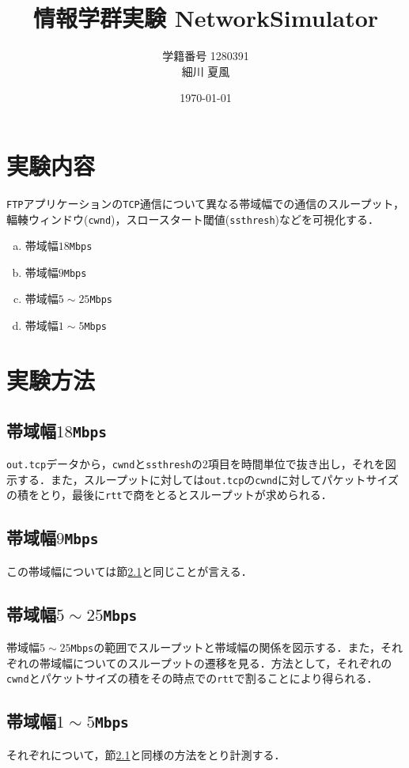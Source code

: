 \documentclass[paper=a4, fontsize=10pt]{jlreq}
\title{情報学群実験 NetworkSimulator}
\author{学籍番号 1280391 \\ 細川 夏風}
\date{\today}
\begin{document}
\maketitle
\section{実験内容}
\texttt{FTP}アプリケーションの\texttt{TCP}通信について異なる帯域幅での通信のスループット，輻輳ウィンドウ(\texttt{cwnd})，スロースタート閾値(\texttt{ssthresh})などを可視化する．
\begin{enumerate}[(a). ]
  \item 帯域幅$18$\texttt{Mbps}
  \item 帯域幅$9$\texttt{Mbps}
  \item 帯域幅$5 \sim 25$\texttt{Mbps}
  \item 帯域幅$1 \sim 5$\texttt{Mbps}
\end{enumerate}

\section{実験方法}
\subsection{帯域幅$18$\texttt{Mbps}}
\label{18Mbps}
\texttt{out.tcp}データから，\texttt{cwnd}と\texttt{ssthresh}の$2$項目を時間単位で抜き出し，それを図示する．また，スループットに対しては\texttt{out.tcp}の\texttt{cwnd}に対してパケットサイズの積をとり，最後に\texttt{rtt}で商をとるとスループットが求められる．

\subsection{帯域幅$9$\texttt{Mbps}}
この帯域幅については節\ref{18Mbps}と同じことが言える．

\subsection{帯域幅$5 \sim 25$\texttt{Mbps}}
帯域幅$5 \sim 25$\texttt{Mbps}の範囲でスループットと帯域幅の関係を図示する．また，それぞれの帯域幅についてのスループットの遷移を見る．方法として，それぞれの\texttt{cwnd}とパケットサイズの積をその時点での\texttt{rtt}で割ることにより得られる．

\subsection{帯域幅$1 \sim 5$\texttt{Mbps}}
それぞれについて，節\ref{18Mbps}と同様の方法をとり計測する．
\end{document}
